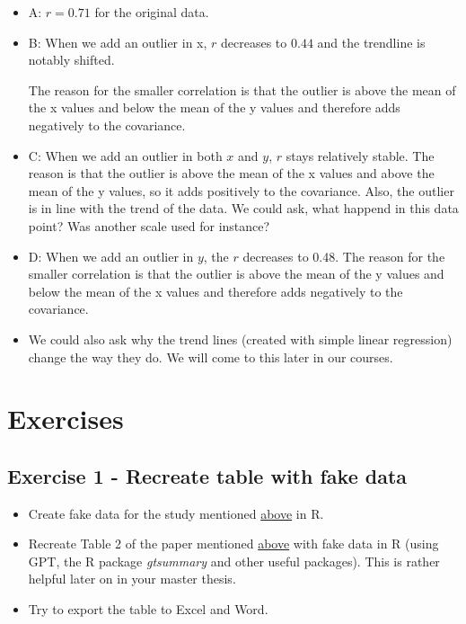 \documentclass[
]{book}
\providecommand{\tightlist}{%
  \setlength{\itemsep}{0pt}\setlength{\parskip}{0pt}}
\begin{document}
\begin{itemize}
\item
  A: \(r=0.71\) for the original data.
\item
  B: When we add an outlier in x, \(r\) decreases to \(0.44\) and the trendline is notably shifted.

  The reason for the smaller correlation is that the outlier is above the mean of the x values and below
  the mean of the y values and therefore adds negatively to the covariance.
\item
  C: When we add an outlier in both \(x\) and \(y\), \(r\) stays relatively stable.
  The reason is that the outlier is above the mean of the x values and above the mean of the y values,
  so it adds positively to the covariance. Also, the outlier is in line with the trend of the data.
  We could ask, what happend in this data point? Was another scale used for instance?
\item
  D: When we add an outlier in \(y\), the \(r\) decreases to 0.48.
  The reason for the smaller correlation is that the outlier is above the mean of the y values
  and below the mean of the x values and therefore adds negatively to the covariance.
\item
  We could also ask why the trend lines (created with simple linear regression) change the way they do.
  We will come to this later in our courses.
\end{itemize}

\section{Exercises}\label{exercises-1}

\subsection{Exercise 1 - Recreate table with fake data}\label{exercise-1---recreate-table-with-fake-data}

\begin{itemize}
\tightlist
\item
  Create fake data for the study mentioned \hyperref[example_study1_physio]{above} in R.
\item
  Recreate Table 2 of the paper mentioned \hyperref[example_study1_physio]{above} with fake data in R (using GPT, the R package \emph{gtsummary} and other useful packages).
  This is rather helpful later on in your master thesis.
\item
  Try to export the table to Excel and Word.
\end{itemize}
\end{document}
